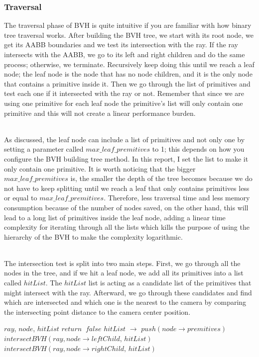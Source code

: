 \documentclass[11pt,a4paper]{article}
\begin{document}
\subsubsection{Traversal}
 The traversal phase of BVH is quite intuitive if you are familiar with how binary tree traversal works. After building the BVH tree, we start with its root node, we get its AABB boundaries and we test its intersection with the ray. If the ray intersects with the AABB, we go to its left and right children and do the same process; otherwise, we terminate. Recursively keep doing this until we reach a leaf node; the leaf node is the node that has no node children, and it is the only node that contains a primitive inside it. Then we go through the list of primitives and test each one if it intersected with the ray or not. Remember that since we are using one primitive for each leaf node the primitive's list will only contain one primitive and this will not create a linear performance burden. 

\noindent
\\
As discussed, the leaf node can include a list of primitives and not only one by setting a parameter called $max\_leaf\_premitives$ to 1; this depends on how you configure the BVH building tree method. In this report, I set the list to make it only contain one primitive. It is worth noticing that the bigger $max\_leaf\_premitives$ is, the smaller the depth of the tree becomes because we do not have to keep splitting until we reach a leaf that only contains primitives less or equal to $max\_leaf\_premitives$. Therefore, less traversal time and less memory consumption because of the number of nodes saved, on the other hand, this will lead to a long list of primitives inside the leaf node, adding a linear time complexity for iterating through all the lists which kills the purpose of using the hierarchy of the BVH to make the complexity logarithmic.

\noindent
\\
The intersection test is split into two main steps. First, we go through all the nodes in the tree, and if we hit a leaf node, we add all its primitives into a list called $hitList$. The $hitList$ list is acting as a candidate list of the primitives that might intersect with the ray.  Afterward, we go through these candidates and find which are intersected and which one is the nearest to the camera by comparing the intersecting point distance to the camera center position.

\begin{algorithm}[H]
	\caption{$intersectBVH$}\label{alg:alg1}
	\begin{algorithmic}
		\Require $ray$, $node$, $hitList$
			\State $return\;\;false$
		\EndIf
		    \State $hitList$ $\rightarrow$ $push(node \rightarrow premitives)$
		\Else
			\State $intersectBVH(ray, node \rightarrow leftChild,\, hitList)$
			\State $intersectBVH(ray, node \rightarrow rightChild,\, hitList)$
		\EndIf
	\end{algorithmic}
\end{algorithm}
\end{document}

